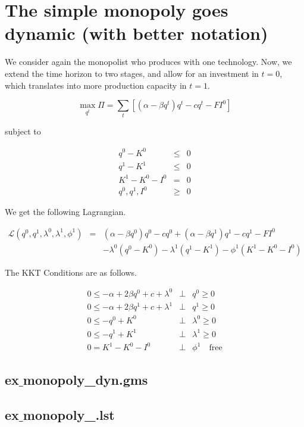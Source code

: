 \documentclass[11pt,a4paper]{article}
\begin{document}



\section{The simple monopoly goes dynamic (with better notation)}
\label{sec:simple-monopoly-goes}

We consider again the monopolist who produces with one technology. Now, we extend the time horizon to two stages, and allow for an investment in $t=0$, which translates into more production capacity in $t=1$.

\begin{equation*}
	\max_{q^t}\Pi = \sum_t\left[(\alpha-\beta q^t)q^t - cq^t  -FI^0\right]
\end{equation*}

subject to

\begin{eqnarray*}
	q^0 - K^0 &\leq& 0\\
	q^1 - K^1 &\leq& 0\\
        K^1 - K^0 - I^0 &=& 0\\
	q^0,q^1,I^0 &\geq& 0 
\end{eqnarray*}
 
We get the following Lagrangian.

\begin{eqnarray*}
	\mathcal{L}(q^0,q^1,\lambda^0,\lambda^1,\phi^1)&=& (\alpha-\beta q^0)q^0 - cq^0 +  (\alpha-\beta q^1)q^1 - cq^1 -FI^0 \\
        && - \lambda^0(q^0-K^0) - \lambda^1(q^1-K^1) - \phi^1(K^1-K^0-I^0)
\end{eqnarray*}

The KKT Conditions are as follows.

\begin{eqnarray*}
	0 \leq -\alpha + 2\beta q^0 + c + \lambda^0 &\bot& q^0 \geq 0\\
        0 \leq -\alpha + 2\beta q^1 + c + \lambda^1 &\bot& q^1 \geq 0\\
	0 \leq -q^0 + K^0 &\bot& \lambda^0 \geq 0 \\
        0 \leq -q^1 + K^1 &\bot& \lambda^1 \geq 0 \\
        0 = K^1 - K^0 - I^0 &\bot& \phi^1 \quad \mbox{free}
\end{eqnarray*}


\subsection*{ex$\_$monopoly\_dyn.gms}



\subsection*{ex$\_$monopoly\_.lst}


\end{document}
